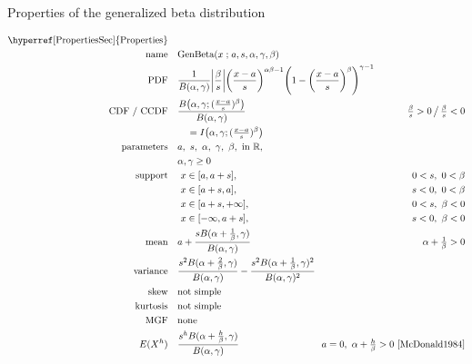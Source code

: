 

\begin{table*}[tp]
\caption[Generalized beta distribution-- Properties]{Properties of the generalized beta distribution}
 \begin{align*}
 \text{\hyperref[PropertiesSec]{Properties}}  \quad& \\
\text{name} \quad & \text{GenBeta}(x\given a,s,\alpha, \gamma,\beta) 
\\
\text{PDF}\quad &   \frac{1}{B(\alpha, \gamma)} \Left|\frac{\beta}{s}\Right|
\Left(\frac{x-a}{s} \Right)^{\alpha \beta -1} \Left(1-\Left(\frac{x-a}{s}\Right)^\beta\Right)^{\gamma -1}
\checked
\hspace{-8em}
\\
\text{CDF / CCDF} \quad  &   \frac{B\Left( \alpha,\gamma; (\tfrac{x-a}{s})^\beta  \Right)}{B(\alpha,\gamma)}
\checked
& \tfrac{\beta}{s} >0 \,\big/ \, \tfrac{\beta}{s} <0
\\ & \quad = I\Left(  \alpha,\gamma; (\tfrac{x-a}{s})^\beta \Right) \checked
\\ 
\text{parameters}\quad &   a,\ s,\ \alpha,\ \gamma,\ \beta, \text{ in } \Real, \\ &  \alpha,\gamma\geq0
\\
\text{support} \quad 
&   \ x \in [a,a+s],  \quad & 0<s,\ 0<\beta  \checked
 \\ 	 		 & \ x\in[a+s,a],  \quad & s<0,\ 0<\beta   \checked
 \\  			 & \ x\in[a+s,+\infty], \quad  & 0<s,\ \beta<0  \checked
 \\  			& \ x\in[-\infty,a+s], \quad & s<0,\ \beta<0 \checked
\\
\text{mean} \quad  &   a+ \frac{s B(\alpha+\tfrac{1}{\beta},\gamma) }{B(\alpha,\gamma)}  \quad & \alpha+\tfrac{1}{\beta} >0
\checked
\\
\text{variance} \quad  & \frac{s^2 B(\alpha+\tfrac{2}{\beta},\gamma) }{B(\alpha,\gamma)} -\frac{s^2 B(\alpha+\tfrac{1}{\beta},\gamma)^2 }{B(\alpha,\gamma)^2} \checked
\\
\text{skew} \quad  &   \text{not simple}
\\
\text{kurtosis} \quad  &   \text{not simple}
\\
\text{MGF} \quad  &  \text{none} %
\\
E(X^h) \quad & \frac{s^h B(\alpha+\tfrac{h}{\beta},\gamma) }{B(\alpha,\gamma)}  \qquad  & \!\!a=0,\ \alpha+\tfrac{h}{\beta} >0
\ \text{\cite{McDonald1984}} \checked
\end{align*}
\end{table*}

